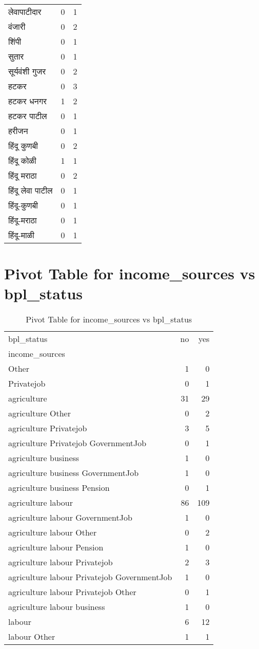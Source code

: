 \documentclass{article}
\begin{document}
\begin{table}
\begin{tabular}{lrr}
लेवापाटीदार & 0 & 1 \\
वंजारी & 0 & 2 \\
शिंपी & 0 & 1 \\
सुतार & 0 & 1 \\
सूर्यवंशी गुजर & 0 & 2 \\
हटकर & 0 & 3 \\
हटकर धनगर & 1 & 2 \\
हटकर पाटील & 0 & 1 \\
हरीजन & 0 & 1 \\
हिंदू कुणबी & 0 & 2 \\
हिंदू कोळी & 1 & 1 \\
हिंदू मराठा & 0 & 2 \\
हिंदू लेवा पाटील & 0 & 1 \\
हिंदू-कुणबी & 0 & 1 \\
हिंदू-मराठा & 0 & 1 \\
हिंदू-माळी & 0 & 1 \\
\bottomrule
\end{tabular}
\end{table}

\section{Pivot Table for income_sources vs bpl_status}
\begin{table}
\caption{Pivot Table for income_sources vs bpl_status}
\label{tab:income_sources_bpl_status}
\begin{tabular}{lrr}
\toprule
bpl_status & no & yes \\
income_sources &  &  \\
\midrule
Other & 1 & 0 \\
Privatejob & 0 & 1 \\
agriculture & 31 & 29 \\
agriculture Other & 0 & 2 \\
agriculture Privatejob & 3 & 5 \\
agriculture Privatejob GovernmentJob & 0 & 1 \\
agriculture business & 1 & 0 \\
agriculture business GovernmentJob & 1 & 0 \\
agriculture business Pension & 0 & 1 \\
agriculture labour & 86 & 109 \\
agriculture labour GovernmentJob & 1 & 0 \\
agriculture labour Other & 0 & 2 \\
agriculture labour Pension & 1 & 0 \\
agriculture labour Privatejob & 2 & 3 \\
agriculture labour Privatejob GovernmentJob & 1 & 0 \\
agriculture labour Privatejob Other & 0 & 1 \\
agriculture labour business & 1 & 0 \\
labour & 6 & 12 \\
labour Other & 1 & 1 \\
\bottomrule
\end{tabular}
\end{table}
\end{document}
